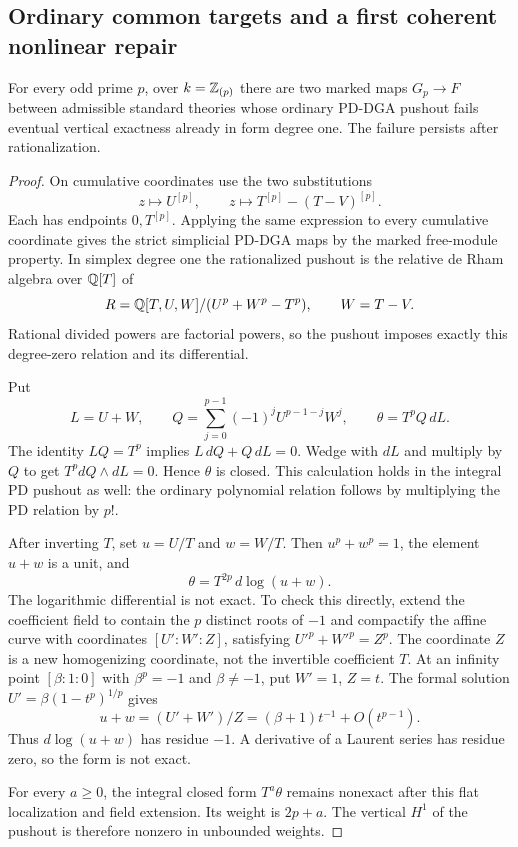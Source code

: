 \subsection{Ordinary common targets and a first coherent nonlinear repair}

\begin{proposition}
\label{sa08:C19}
For every odd prime $p$, over $k=\mathbb Z_{(p)}$ there are two marked
maps $G_p\to F$ between admissible standard theories whose ordinary
PD-DGA pushout fails eventual vertical exactness already in form
degree one. The failure persists after rationalization.
\end{proposition}
\begin{proof}
On cumulative coordinates use the two substitutions
\[
 z\longmapsto U^{[p]},\qquad
 z\longmapsto T^{[p]}-(T-V)^{[p]}.
\]
Each has endpoints $0,T^{[p]}$. Applying the same expression to
every cumulative coordinate gives the strict simplicial
PD-DGA maps by the marked free-module property. In simplex
degree one the rationalized pushout is the relative de Rham
algebra over $\mathbb Q[T]$ of
\[
 R=\mathbb Q[T,U,W]/(U^p+W^p-T^p),\qquad W=T-V.
\]
Rational divided powers are factorial powers, so the pushout
imposes exactly this degree-zero relation and its differential.

Put
\[
 L=U+W,\qquad
 Q=\sum_{j=0}^{p-1}(-1)^jU^{p-1-j}W^j,\qquad
 \theta=T^pQ\,dL.
\]
The identity $LQ=T^p$ implies $L\,dQ+Q\,dL=0$.
Wedge with $dL$ and multiply by $Q$ to get
$T^p dQ\wedge dL=0$. Hence $\theta$ is closed.
This calculation holds in the integral PD pushout as well:
the ordinary polynomial relation follows by multiplying
the PD relation by $p!$.

After inverting $T$, set $u=U/T$ and $w=W/T$. Then
$u^p+w^p=1$, the element $u+w$ is a unit, and
\[
 \theta=T^{2p}\,d\log(u+w).
\]
The logarithmic differential is not exact. To check this
directly, extend the coefficient field to contain the
$p$ distinct roots of $-1$ and compactify the affine
curve with coordinates $[U':W':Z]$, satisfying
$U'^p+W'^p=Z^p$. The coordinate $Z$ is a new
homogenizing coordinate, not the invertible coefficient
$T$. At an infinity point $[\beta:1:0]$ with
$\beta^p=-1$ and $\beta\ne-1$, put $W'=1$, $Z=t$.
The formal solution
$U'=\beta(1-t^p)^{1/p}$ gives
\[
 u+w=(U'+W')/Z=(\beta+1)t^{-1}+O(t^{p-1}).
\]
Thus $d\log(u+w)$ has residue $-1$. A derivative
of a Laurent series has residue zero, so the form
is not exact.

For every $a\geq0$, the integral closed form
$T^a\theta$ remains nonexact after this flat
localization and field extension. Its weight
is $2p+a$. The vertical $H^1$ of the pushout
is therefore nonzero in unbounded weights.
\end{proof}

